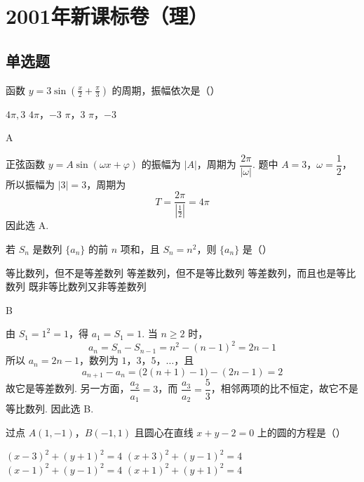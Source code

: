 
\chapter{2001年新课标卷（理）}
\section{单选题}
\begin{problem}
函数 \(y=3\sin\left(\frac{x}{2}+\frac{\pi}{3}\right)\) 的周期，振幅依次是（\quad）

\choices
    {\(4\pi,3\)}
    {\(4\pi\)，\(-3\)}
    {\(\pi\)，\(3\)}
    {\(\pi\)，\(-3\)}
\end{problem}

\begin{answer}
A
\end{answer}

\begin{solution}
正弦函数 \(y=A\sin(\omega x+\varphi)\) 的振幅为 \(\lvert A\rvert\)，周期为 \(\dfrac{2\pi}{\lvert\omega\rvert}\). 题中 \(A=3\)，\(\omega=\dfrac12\)，所以振幅为 \(\lvert3\rvert=3\)，周期为
\[
T=\frac{2\pi}{\left\lvert\frac12\right\rvert}=4\pi
\]
因此选 A.
\end{solution}

\begin{problem}
若 \(S_n\) 是数列 \(\{a_n\}\) 的前 \(n\) 项和，且 \(S_n=n^2\)，则 \(\{a_n\}\) 是（\quad）

\choices
    {等比数列，但不是等差数列}
    {等差数列，但不是等比数列}
    {等差数列，而且也是等比数列}
    {既非等比数列又非等差数列}
\end{problem}

\begin{answer}
B
\end{answer}

\begin{solution}
由 \(S_1=1^2=1\)，得 \(a_1=S_1=1\). 当 \(n\geqslant2\) 时，
\[
a_n=S_n-S_{n-1}=n^2-(n-1)^2=2n-1
\]
所以 \(a_n=2n-1\)，数列为 \(1\)，\(3\)，\(5\)，\(\ldots\)，且
\[
a_{n+1}-a_n=\bigl(2(n+1)-1\bigr)-(2n-1)=2
\]
故它是等差数列. 另一方面，\(\dfrac{a_2}{a_1}=3\)，而 \(\dfrac{a_3}{a_2}=\dfrac53\)，相邻两项的比不恒定，故它不是等比数列. 因此选 B.
\end{solution}

\begin{problem}
过点 \(A(1,-1)\)，\(B(-1,1)\) 且圆心在直线 \(x+y-2=0\) 上的圆的方程是（\quad）

\choices
    {\((x-3)^2+(y+1)^2=4\)}
    {\((x+3)^2+(y-1)^2=4\)}
    {\((x-1)^2+(y-1)^2=4\)}
    {\((x+1)^2+(y+1)^2=4\)}
\end{problem}

